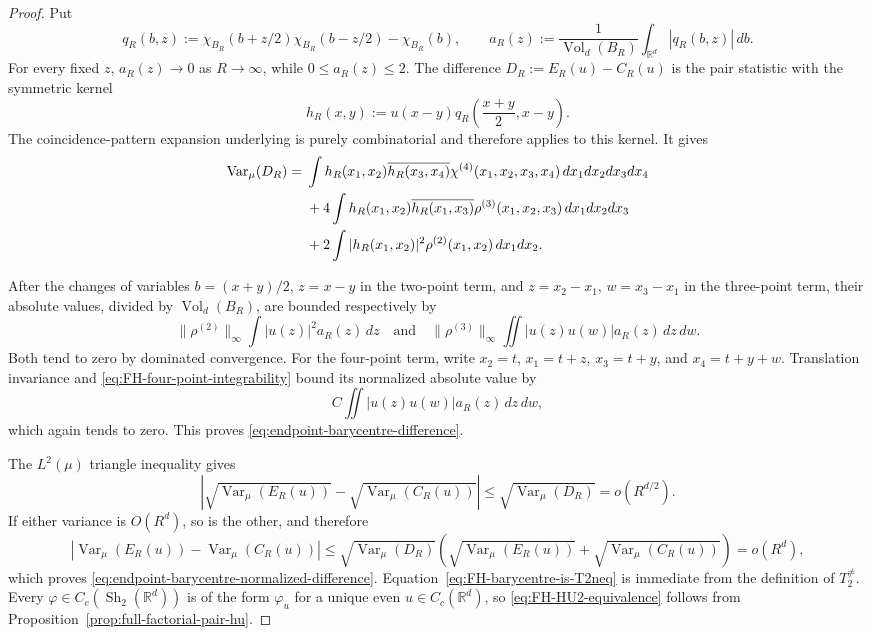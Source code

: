 \documentclass[11pt,reqno,a4paper]{amsart}
\numberwithin{equation}{section}
\theoremstyle{compact}
\theoremstyle{definition}
\theoremstyle{definition}
\newcommand{\Var}{\operatorname{Var}}
\newcommand{\Vol}{\operatorname{Vol}}
\newcommand{\Sh}{\operatorname{Sh}}
\begin{document}
\begin{proof}
Put
\[
  q_R(b,z)
  :=\chi_{B_R}(b+z/2)\chi_{B_R}(b-z/2)-\chi_{B_R}(b),
  \qquad
  a_R(z):=\frac1{\Vol_d(B_R)}\int_{\mathbb R^d}|q_R(b,z)|\,db.
\]
For every fixed $z$, $a_R(z)\to0$ as $R\to\infty$, while
$0\leq a_R(z)\leq2$.  The difference $D_R:=E_R(u)-C_R(u)$ is the pair
statistic with the symmetric kernel
\[
  h_R(x,y):=u(x-y)q_R\!\left(\frac{x+y}{2},x-y\right).
\]
The coincidence-pattern expansion underlying
\cite[Equations~(4.3)--(4.5)]{FH26} is purely combinatorial and therefore
applies to this kernel.  It gives
\begin{align}
  \Var_\mu(D_R)
  ={}&
  \int h_R(x_1,x_2)\overline{h_R(x_3,x_4)}
  \chi^{(4)}(x_1,x_2,x_3,x_4)\,dx_1dx_2dx_3dx_4
  \notag\\
  &+4\int h_R(x_1,x_2)\overline{h_R(x_1,x_3)}
  \rho^{(3)}(x_1,x_2,x_3)\,dx_1dx_2dx_3
  \notag\\
  &+2\int |h_R(x_1,x_2)|^2
  \rho^{(2)}(x_1,x_2)\,dx_1dx_2.
  \label{eq:FH-coincidence-expansion}
\end{align}

After the changes of variables $b=(x+y)/2$, $z=x-y$ in the two-point term,
and $z=x_2-x_1$, $w=x_3-x_1$ in the three-point term, their absolute values,
divided by $\Vol_d(B_R)$, are bounded respectively by
\[
  \|\rho^{(2)}\|_\infty
  \int |u(z)|^2a_R(z)\,dz
  \quad\text{and}\quad
  \|\rho^{(3)}\|_\infty
  \iint |u(z)u(w)|a_R(z)\,dz\,dw.
\]
Both tend to zero by dominated convergence.  For the four-point term, write
$x_2=t$, $x_1=t+z$, $x_3=t+y$, and $x_4=t+y+w$.  Translation invariance and
\eqref{eq:FH-four-point-integrability} bound its normalized absolute value by
\[
  C\iint |u(z)u(w)|a_R(z)\,dz\,dw,
\]
which again tends to zero.  This proves
\eqref{eq:endpoint-barycentre-difference}.

The $L^2(\mu)$ triangle inequality gives
\[
  \left|\sqrt{\Var_\mu(E_R(u))}
       -\sqrt{\Var_\mu(C_R(u))}\right|
  \leq \sqrt{\Var_\mu(D_R)}=o(R^{d/2}).
\]
If either variance is $O(R^d)$, so is the other, and therefore
\[
  |\Var_\mu(E_R(u))-\Var_\mu(C_R(u))|
  \leq
  \sqrt{\Var_\mu(D_R)}
  \left(\sqrt{\Var_\mu(E_R(u))}+\sqrt{\Var_\mu(C_R(u))}\right)
  =o(R^d),
\]
which proves \eqref{eq:endpoint-barycentre-normalized-difference}.
Equation~\eqref{eq:FH-barycentre-is-T2neq} is immediate from the definition of
$T_2^{\neq}$.  Every $\varphi\in C_c(\Sh_2(\mathbb R^d))$ is of the form
$\varphi_u$ for a unique even $u\in C_c(\mathbb R^d)$, so
\eqref{eq:FH-HU2-equivalence} follows from
Proposition~\ref{prop:full-factorial-pair-hu}.
\end{proof}
\end{document}
